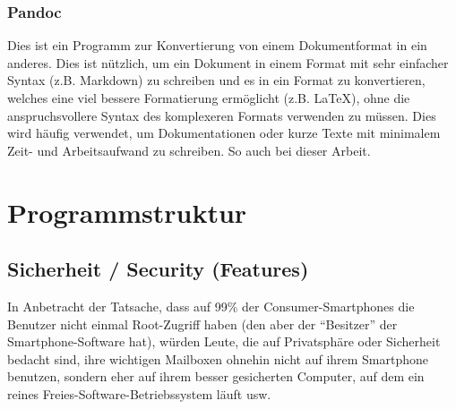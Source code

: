 \documentclass[a4paper,11pt]{article}
\begin{document}
\subsubsection{Pandoc}
Dies ist ein Programm zur Konvertierung von einem Dokumentformat in ein anderes. Dies ist nützlich, um ein Dokument in einem Format mit sehr einfacher Syntax (z.B. Markdown) zu schreiben und es in ein Format zu konvertieren, welches eine viel bessere Formatierung ermöglicht (z.B. LaTeX), ohne die anspruchsvollere Syntax des komplexeren Formats verwenden zu müssen. Dies wird häufig verwendet, um Dokumentationen oder kurze Texte mit minimalem Zeit- und Arbeitsaufwand zu schreiben. So auch bei dieser Arbeit.

\section{Programmstruktur}

\subsection{Sicherheit / Security (Features)}
In Anbetracht der Tatsache, dass auf 99\% der Consumer-Smartphones die Benutzer nicht einmal Root-Zugriff haben (den aber der ``Besitzer'' der Smartphone-Software hat), würden Leute, die auf Privatsphäre oder Sicherheit bedacht sind, ihre wichtigen Mailboxen ohnehin nicht auf ihrem Smartphone benutzen, sondern eher auf ihrem besser gesicherten Computer, auf dem ein reines Freies-Software-Betriebssystem läuft usw.\\
\end{document}
